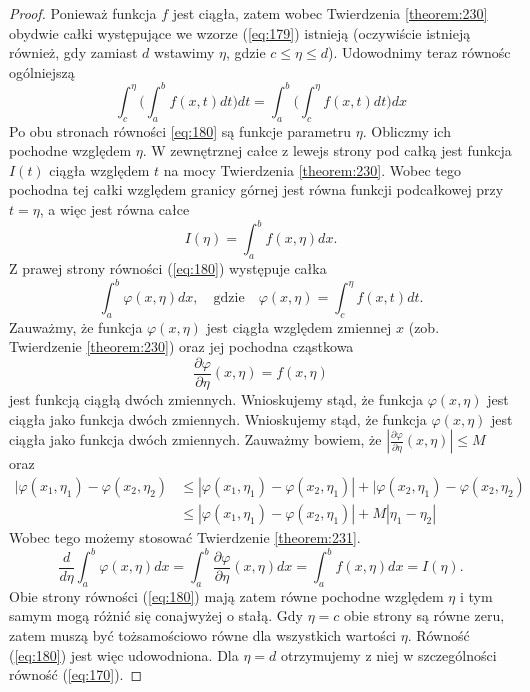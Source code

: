 \documentclass[leqno]{article}
\begin{document}
\begin{justify}
\begin{proof}
    Ponieważ funkcja $f$ jest ciągła, zatem wobec Twierdzenia \ref{theorem:230} obydwie całki występujące we wzorze (\ref{eq:179}) istnieją
    (oczywiście istnieją również, gdy zamiast $d$ wstawimy $\eta$, gdzie $c \leqslant \eta \leqslant d$). Udowodnimy teraz równośc ogólniejszą
    \begin{equation}\label{eq:180}
        \int_{c}^{\eta}\Big( \int_{a}^{b}f(x,t)dt\Big)dt = \int_{a}^{b}\Big( \int_{c}^{\eta}f(x,t)dt\Big)dx
    \end{equation}
    Po obu stronach równości \ref{eq:180} są funkcje parametru $\eta$. Obliczmy ich pochodne względem $\eta$. 
    W zewnętrznej całce z lewejs strony pod całką jest funkcja $I(t)$ ciągła względem $t$ na mocy Twierdzenia \ref{theorem:230}.
    Wobec tego pochodna tej całki względem granicy górnej jest równa funkcji podcałkowej przy $t = \eta$, a więc jest równa całce
    \[
        I(\eta) = \int_{a}^{b}f(x, \eta)dx.
    \]
    Z prawej strony równości (\ref{eq:180}) występuje całka 
    \[
        \int_{a}^{b}\varphi(x,\eta)dx, \quad \text{gdzie} \quad \varphi(x,\eta) = \int_{c}^{\eta}f(x,t)dt.
    \]
    Zauważmy, że funkcja $\varphi(x, \eta)$ jest ciągła względem zmiennej $x$ (zob. Twierdzenie \ref{theorem:230}) oraz jej pochodna cząstkowa 
    \[
        \frac{\partial \varphi}{\partial \eta}(x,\eta) = f(x, \eta)
    \]
    jest funkcją ciągłą dwóch zmiennych. Wnioskujemy stąd, że funkcja $\varphi(x, \eta)$ jest ciągła jako funkcja dwóch zmiennych. 
    Wnioskujemy stąd, że funkcja $\varphi(x, \eta)$ jest ciągła jako funkcja dwóch zmiennych. Zauważmy bowiem, że $|\frac{\partial \varphi}{\partial \eta}(x, \eta)| \leqslant M$
    oraz 
    \[
        \begin{aligned}
            |\varphi(x_1, \eta_1) - \varphi(x_2, \eta_2) &\leqslant |\varphi(x_1, \eta_1) - \varphi(x_2, \eta_1)| + |\varphi(x_2, \eta_1) - \varphi(x_2, \eta_2) \\
            &\leqslant |\varphi(x_1, \eta_1) - \varphi(x_2, \eta_1)| + M|\eta_1 - \eta_2|
        \end{aligned}
    \]
    Wobec tego możemy stosować Twierdzenie \ref{theorem:231}.
    \[
        \frac{d}{d \eta}\int_{a}^{b}\varphi(x, \eta)dx = \int_{a}^{b}\frac{\partial \varphi}{\partial \eta}(x, \eta)dx = \int_{a}^{b}f(x, \eta)dx = I(\eta).
    \]
    Obie strony równości (\ref{eq:180}) mają zatem równe pochodne względem $\eta$ i tym samym mogą różnić się conajwyżej o stałą.
    Gdy $\eta = c$ obie strony są równe zeru, zatem muszą być tożsamościowo równe dla wszystkich wartości $\eta$. Równość (\ref{eq:180}) jest więc udowodniona.
    Dla $\eta = d$ otrzymujemy z niej w szczególności równość (\ref{eq:170}).
\end{proof}


\end{justify}
\end{document}
